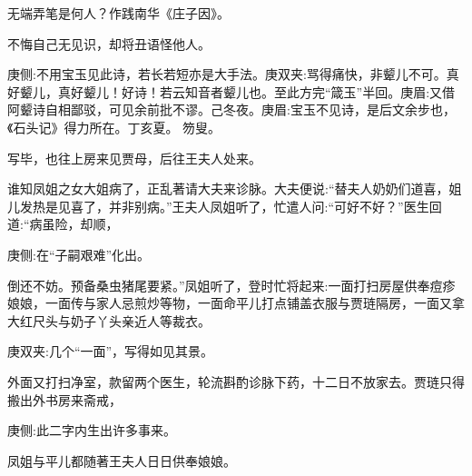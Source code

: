 \begin{poem}
    \begin{pl}无端弄笔是何人？作践南华《庄子因》。\end{pl}

    \begin{pl}不悔自己无见识，却将丑语怪他人。\end{pl}
    \begin{note}庚侧:不用宝玉见此诗，若长若短亦是大手法。庚双夹:骂得痛快，非颦儿不可。真好颦儿，真好颦儿！好诗！若云知音者颦儿也。至此方完“箴玉”半回。庚眉:又借阿颦诗自相鄙驳，可见余前批不谬。己冬夜。庚眉:宝玉不见诗，是后文余步也，《石头记》得力所在。丁亥夏。 笏叟。\end{note}
\end{poem}


\begin{parag}
    写毕，也往上房来见贾母，后往王夫人处来。
\end{parag}


\begin{parag}
    谁知凤姐之女大姐病了，正乱著请大夫来诊脉。大夫便说:“替夫人奶奶们道喜，姐儿发热是见喜了，并非别病。”王夫人凤姐听了，忙遣人问:“可好不好？”医生回道:“病虽险，却顺，\begin{note}庚侧:在“子嗣艰难”化出。\end{note}倒还不妨。预备桑虫猪尾要紧。”凤姐听了，登时忙将起来:一面打扫房屋供奉痘疹娘娘，一面传与家人忌煎炒等物，一面命平儿打点铺盖衣服与贾琏隔房，一面又拿大红尺头与奶子丫头亲近人等裁衣。\begin{note}庚双夹:几个“一面”，写得如见其景。\end{note}外面又打扫净室，款留两个医生，轮流斟酌诊脉下药，十二日不放家去。贾琏只得搬出外书房来斋戒，\begin{note}庚侧:此二字内生出许多事来。\end{note}凤姐与平儿都随著王夫人日日供奉娘娘。
\end{parag}


